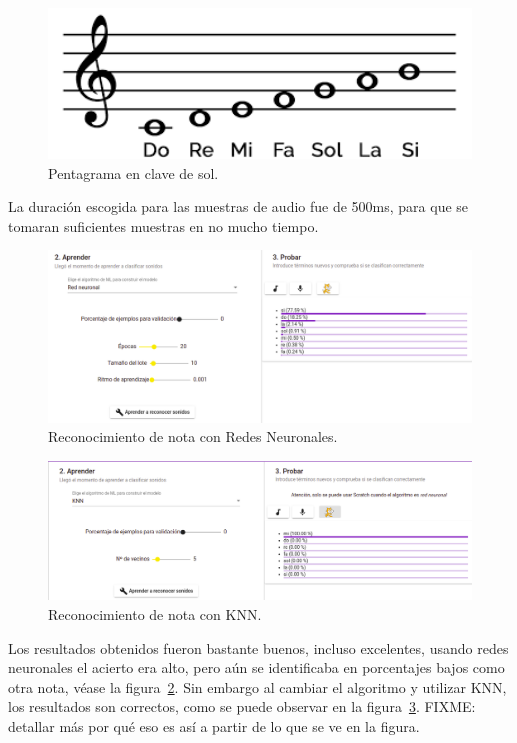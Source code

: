 \documentclass[a4paper, 12pt]{book}
\begin{document}
\begin{figure}
	\centering
	\includegraphics[width=12cm,keepaspectratio]{img/pentagrama.png}
	\caption{Pentagrama en clave de sol.}\label{fig:pentagrama}
\end{figure}

La duración escogida para las muestras de audio fue de 500ms, para que se tomaran suficientes muestras en no mucho tiempo.

\begin{figure}
	\centering
	\includegraphics{img/nn1.png}
	\caption{Reconocimiento de nota con Redes Neuronales.}\label{fig:neural-networks}
\end{figure}

\begin{figure}
	\centering
	\includegraphics{img/knn1.png}
	\caption{Reconocimiento de nota con KNN.}\label{fig:knn}
\end{figure}

Los resultados obtenidos fueron bastante buenos, incluso excelentes, usando redes neuronales el acierto era alto, pero aún se identificaba en porcentajes bajos como otra nota, véase la figura~\ref{fig:neural-networks}. Sin embargo al cambiar el algoritmo y utilizar KNN, los resultados son correctos, como se puede observar en la figura~\ref{fig:knn}. FIXME: detallar más por qué eso es así a partir de lo que se ve en la figura.
\end{document}
